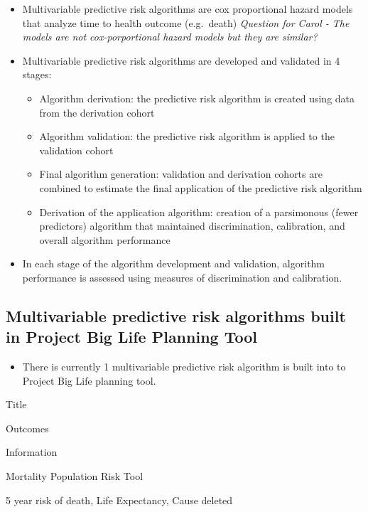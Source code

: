 \documentclass[]{book}
\providecommand{\tightlist}{%
  \setlength{\itemsep}{0pt}\setlength{\parskip}{0pt}}
\begin{document}
\begin{itemize}
\item
  Multivariable predictive risk algorithms are cox proportional hazard
  models that analyze time to health outcome (e.g.~death) \emph{Question
  for Carol - The models are not cox-porportional hazard models but they
  are similar?}
\item
  Multivariable predictive risk algorithms are developed and validated
  in 4 stages:

  \begin{itemize}
  \tightlist
  \item
    Algorithm derivation: the predictive risk algorithm is created using
    data from the derivation cohort
  \item
    Algorithm validation: the predictive risk algorithm is applied to
    the validation cohort
  \item
    Final algorithm generation: validation and derivation cohorts are
    combined to estimate the final application of the predictive risk
    algorithm
  \item
    Derivation of the application algorithm: creation of a parsimonous
    (fewer predictors) algorithm that maintained discrimination,
    calibration, and overall algorithm performance
  \end{itemize}
\item
  In each stage of the algorithm development and validation, algorithm
  performance is assessed using measures of discrimination and
  calibration.
\end{itemize}

\subsection{Multivariable predictive risk algorithms built in Project
Big Life Planning
Tool}\label{multivariable-predictive-risk-algorithms-built-in-project-big-life-planning-tool}

\begin{itemize}
\tightlist
\item
  There is currently 1 multivariable predictive risk algorithm is built
  into to Project Big Life planning tool.
\end{itemize}

Title

Outcomes

Information

Mortality Population Risk Tool

5 year risk of death, Life Expectancy, Cause deleted
\end{document}
